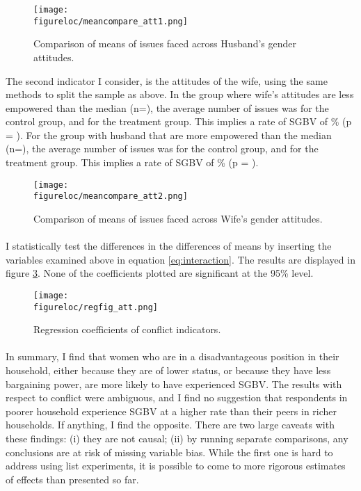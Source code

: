 \documentclass[10pt,a4paper]{scrartcl} %
\newcommand{\figureloc}{C:/Users/Koen/Dropbox/PhD/Papers/CongoGBV/Figures}
\begin{document}
\begin{figure}[H]
  \texttt{[image: \\figureloc/meancompare\_att1.png]}
  \caption{Comparison of means of issues faced across Husband's gender attitudes.}
  \label{fig:meancompare_att1}
\end{figure}

The second indicator I consider, is the attitudes of the wife, using the same methods to split the sample as above. In the group where wife's attitudes are less empowered than the median (n=), the average number of issues was  for the control group, and  for the treatment group. This implies a rate of SGBV of \% (p = ). For the group with husband that are more empowered than the median (n=), the average number of issues was  for the control group, and  for the treatment group. This implies a rate of SGBV of \% (p = ).

\begin{figure}[H]
  \texttt{[image: \\figureloc/meancompare\_att2.png]}
  \caption{Comparison of means of issues faced across Wife's gender attitudes.}
  \label{fig:meancompare_att2}
\end{figure}

\paragraph{}
I statistically test the differences in the differences of means by inserting the variables examined above in equation \ref{eq:interaction}. The results are displayed in figure \ref{fig:regfig_att}. None of the coefficients plotted are significant at the 95\% level.

\begin{figure}[H]
  \texttt{[image: \\figureloc/regfig\_att.png]}
  \caption{Regression coefficients of conflict indicators.}
  \label{fig:regfig_att}
\end{figure}


\paragraph{}
In summary, I find that women who are in a disadvantageous position in their household, either because they are of lower status, or because they have less bargaining power, are more likely to have experienced SGBV. The results with respect to conflict were ambiguous, and I find no suggestion that respondents in poorer household experience SGBV at a higher rate than their peers in richer households. If anything, I find the opposite. There are two large caveats with these findings: (i) they are not causal; (ii) by running separate comparisons, any conclusions are at risk of missing variable bias. While the first one is hard to address using list experiments, it is possible to come to more rigorous estimates of effects than presented so far. 
\end{document}
